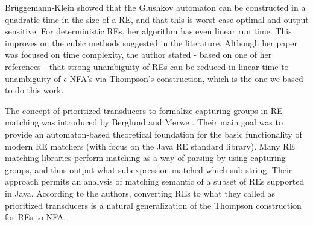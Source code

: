 \documentclass[oneside,12pt]{scrbook}
\theoremstyle{definition}
\theoremstyle{plain}
\theoremstyle{definition}
\begin{document}


Br{\"{u}}ggemann-Klein \cite{Bruggemann-Klein1992} showed that the Glushkov automaton can be constructed in a quadratic time in the size of a RE, and that this is worst-case optimal and output sensitive. For deterministic REs, her algorithm has even linear run time. This improves on the cubic methods suggested in the literature. Although her paper was focused on time complexity, the author stated - based on one of her references - that strong unambiguity of REs can be reduced in linear time to unambiguity of $\epsilon$-NFA's via Thompson's construction, which is the one we based to do this work.


The concept of prioritized transducers to formalize capturing groups in RE matching was introduced by Berglund and Merwe \cite{Berglund2016}. Their main goal was to provide an automaton-based theoretical foundation for the basic functionality of modern RE matchers (with focus on the Java RE standard library). Many RE matching libraries perform matching as a way of parsing by using capturing groups, and thus output what subexpression matched which sub-string. Their approach permits an analysis of matching semantic of a subset of REs supported in Java. According to the authors, converting REs to what they called as prioritized transducers is a natural generalization of the Thompson construction for REs to NFA.
\end{document}
